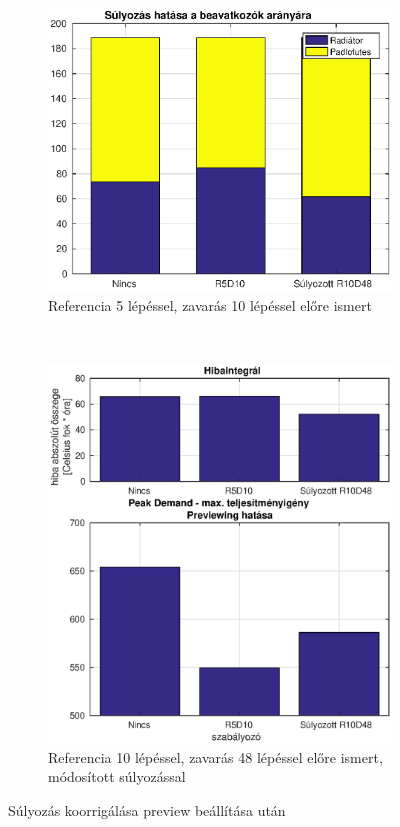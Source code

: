 \documentclass[14pt,handout]{beamer}
\begin{document}
\begin{frame}
\begin{figure}[H]
	\begin{subfigure}[t]{0.47\textwidth}
		\centering
		\includegraphics[trim=0 -40 0 0, clip,width=\textwidth]{figures/onlab/compare/A_diff_compareEnergy}
		\caption{Referencia 5 lépéssel, zavarás 10 lépéssel előre ismert}
		\label{fig:mpc-c-p5d10}
	\end{subfigure}
	~
	\begin{subfigure}[t]{0.47\textwidth}
		\centering
		\includegraphics[trim=0 0 0 0, clip,width=\textwidth]{figures/onlab/compare/A_diff_compareComfort}
		\caption{Referencia 10 lépéssel, zavarás 48 lépéssel előre ismert, módosított súlyozással}
		\label{fig:mpc-cdiff-p10d48}
	\end{subfigure}
\caption{Súlyozás koorrigálása preview beállítása után}
\end{figure}


\end{frame}
\end{document}
